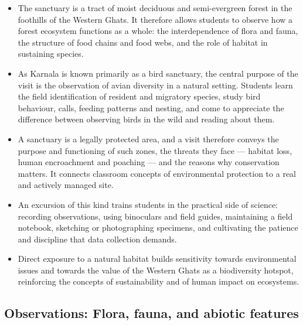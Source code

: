 \documentclass[a4paper, 11pt]{article}
\begin{document}
		\begin{itemize}
			
			\item {} The sanctuary is a tract of moist deciduous and semi-\hspace{0pt}evergreen forest in the foothills of the Western Ghats. It therefore allows students to observe how a forest ecosystem functions as a whole: the interdependence of flora and fauna, the structure of food chains and food webs, and the role of habitat in sustaining species.
			
			\item {} As Karnala is known primarily as a bird sanctuary, the central purpose of the visit is the observation of avian diversity in a natural setting. Students learn the field identification of resident and migratory species, study bird behaviour, calls, feeding patterns and nesting, and come to appreciate the difference between observing birds in the wild and reading about them.
			
			\item {} A sanctuary is a legally protected area, and a visit therefore conveys the purpose and functioning of such zones, the threats they face --- habitat loss, human encroachment and poaching --- and the reasons why conservation matters. It connects classroom concepts of environmental protection to a real and actively managed site.
			
			\item {} An excursion of this kind trains students in the practical side of science: recording observations, using binoculars and field guides, maintaining a field notebook, sketching or photographing specimens, and cultivating the patience and discipline that data collection demands.
			
			\item {} Direct exposure to a natural habitat builds sensitivity towards environmental issues and towards the value of the Western Ghats as a biodiversity hotspot, reinforcing the concepts of sustainability and of human impact on ecosystems.
			
		\end{itemize}
		
		\subsection{Observations: Flora, fauna, and abiotic features}
			
\end{document}
